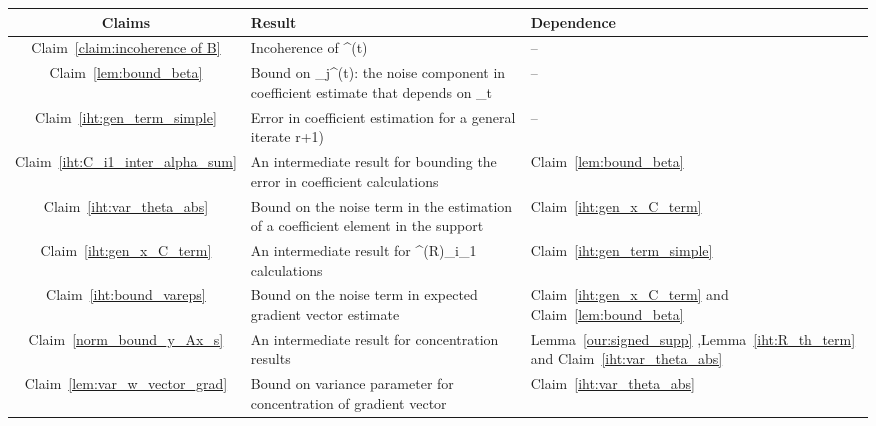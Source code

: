 \documentclass{article}
\def\[#1\]{{$#1$}}
\def\b#1{{\mathbf{#1}}}
\begin{document}
\begin{table}[!h]
\begin{minipage}{0.5\textwidth}
{\begin{tabular}{c|p{4.5cm}|p{2cm}}
		\hline
		\textbf{Claims} &\textbf{Result} &\textbf{Dependence}\\ \hline
		Claim~\ref{claim:incoherence of B} & Incoherence of \[\b{A}^{(t)}\] &-- \\\hline
		Claim~\ref{lem:bound_beta}& Bound on \[\beta_j^{(t)}\]: the noise component in coefficient estimate that depends on \[\epsilon_t\]&-- \\\hline
		Claim~\ref{iht:gen_term_simple}  &Error in coefficient estimation for a general iterate \[(r+1)\] &-- \\\hline
		Claim~\ref{iht:C_i1_inter_alpha_sum} &An intermediate result for bounding the error in coefficient calculations&  Claim~\ref{lem:bound_beta}\\ \hline
		Claim~\ref{iht:var_theta_abs} &Bound on the noise term in the estimation of a coefficient element in the support& Claim~\ref{iht:gen_x_C_term} \\ \hline 
		Claim~\ref{iht:gen_x_C_term} &An intermediate result for \[\vartheta^{(R)}_{i_1}\] calculations &Claim~\ref{iht:gen_term_simple} \\ \hline 
		Claim~\ref{iht:bound_vareps} &Bound on the noise term in expected gradient vector estimate& Claim~\ref{iht:gen_x_C_term} and Claim~\ref{lem:bound_beta} \\ \hline 		
		Claim~\ref{norm_bound_y_Ax_s} & An intermediate result for concentration results&Lemma~\ref{our:signed_supp} ,Lemma~\ref{iht:R_th_term} and Claim~\ref{iht:var_theta_abs} \\ \hline
	    Claim~\ref{lem:var_w_vector_grad} &Bound on variance parameter for concentration of gradient vector& Claim~\ref{iht:var_theta_abs} \\ \hline 
	    

\end{tabular}}
\end{minipage}
\end{table}
\end{document}
